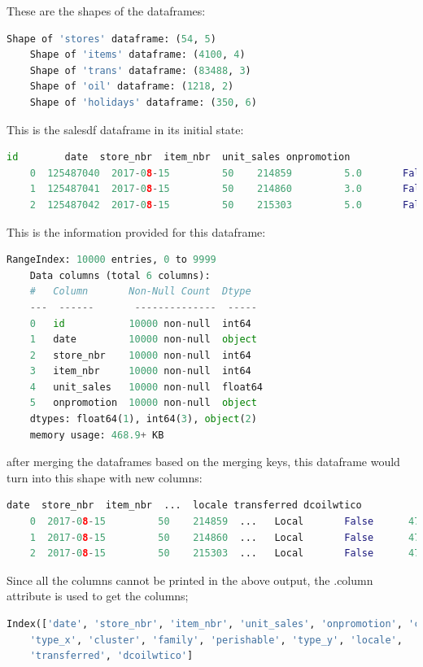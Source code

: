 These are the shapes of the dataframes:

\begin{lstlisting}[language=Python]
	Shape of 'stores' dataframe: (54, 5)
	Shape of 'items' dataframe: (4100, 4)
	Shape of 'trans' dataframe: (83488, 3)
	Shape of 'oil' dataframe: (1218, 2)
	Shape of 'holidays' dataframe: (350, 6)
\end{lstlisting}

This is the salesdf dataframe in its initial state:

\begin{lstlisting}[language=Python]
	id        date  store_nbr  item_nbr  unit_sales onpromotion
	0  125487040  2017-08-15         50    214859         5.0       False
	1  125487041  2017-08-15         50    214860         3.0       False
	2  125487042  2017-08-15         50    215303         5.0       False
\end{lstlisting}

This is the information provided for this dataframe:

\begin{lstlisting}[language=Python]
	RangeIndex: 10000 entries, 0 to 9999
	Data columns (total 6 columns):
	#   Column       Non-Null Count  Dtype  
	---  ------       --------------  -----  
	0   id           10000 non-null  int64  
	1   date         10000 non-null  object 
	2   store_nbr    10000 non-null  int64  
	3   item_nbr     10000 non-null  int64  
	4   unit_sales   10000 non-null  float64
	5   onpromotion  10000 non-null  object 
	dtypes: float64(1), int64(3), object(2)
	memory usage: 468.9+ KB
\end{lstlisting}

after merging the dataframes based on the merging keys, this dataframe would turn into this shape with new columns:

\begin{lstlisting}[language=Python]
	date  store_nbr  item_nbr  ...  locale transferred dcoilwtico
	0  2017-08-15         50    214859  ...   Local       False      47.57
	1  2017-08-15         50    214860  ...   Local       False      47.57
	2  2017-08-15         50    215303  ...   Local       False      47.57
\end{lstlisting}

Since all the columns cannot be printed in the above output, the .column attribute is used to get the columns;

\begin{lstlisting}[language=Python]
	Index(['date', 'store_nbr', 'item_nbr', 'unit_sales', 'onpromotion', 'city',
	'type_x', 'cluster', 'family', 'perishable', 'type_y', 'locale',
	'transferred', 'dcoilwtico']
\end{lstlisting}

